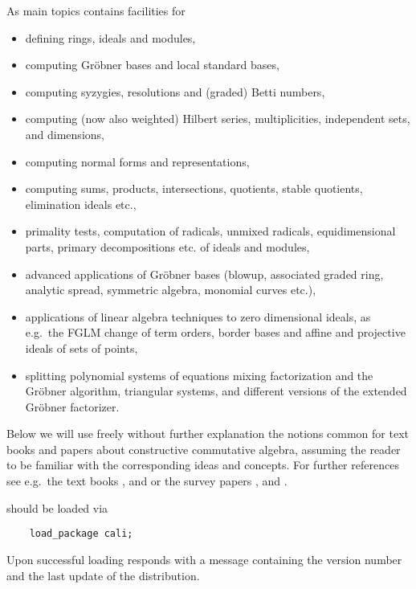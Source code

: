 As main topics  contains facilities for
\begin{itemize}
\item defining rings, ideals and modules,

\item computing Gr\"obner bases and local standard bases,

\item computing syzygies, resolutions and (graded) Betti numbers,

\item computing (now also weighted) Hilbert series, multiplicities,
independent sets, and dimensions,

\item computing normal forms and representations,

\item computing sums, products, intersections, quotients, stable
quotients, elimination ideals etc.,

\item primality tests, computation of radicals, unmixed radicals,
equidimensional parts, primary decompositions etc. of ideals and
modules,

\item advanced applications of Gr\"obner bases (blowup, associated graded
ring, analytic spread, symmetric algebra, monomial curves etc.),

\item applications of linear algebra techniques to zero dimensional
	ideals, as e.g.\ the FGLM change of term orders, border bases
	and affine and projective ideals of sets of points,

\item splitting polynomial systems of equations mixing factorization and
the Gr\"obner algorithm, triangular systems, and different versions of the
extended Gr\"obner factorizer.

\end{itemize}

Below we will use freely without further explanation the notions
common for text books and papers about constructive commutative
algebra, assuming the reader to be familiar with the corresponding
ideas and concepts. For further references see e.g.\ the text books
\cite{Becker:93}, \cite{Cox:92} and \cite{Mishra:93} or the survey papers
\cite{Buchberger:85}, \cite{Buchberger:88} and \cite{Robbiano:89}.

 should be loaded via
\begin{verbatim}
    load_package cali;
\end{verbatim}
Upon successful loading  responds with a message containing the
version number and the last update of the distribution.

